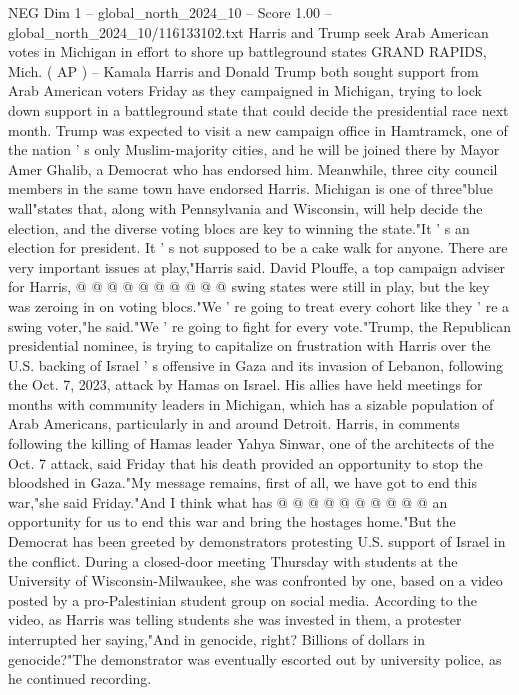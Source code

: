 \begin{textsample}{NEG Dim 1 – global\_north\_2024\_10 – Score 1.00 – global\_north\_2024\_10/116133102.txt}  \label{ex:f1_neg_374}
Harris and Trump seek Arab American votes in Michigan in effort to shore up battleground states GRAND RAPIDS, Mich. ( AP ) -- Kamala Harris and Donald Trump both sought support from Arab American voters Friday as they campaigned in Michigan, trying to lock down support in a battleground state that could decide the presidential race next month.
Trump was expected to visit a new campaign office in Hamtramck, one of the nation ' s only Muslim-majority cities, and he will be joined there by Mayor Amer Ghalib, a Democrat who has endorsed him.
Meanwhile, three city council members in the same town have endorsed Harris.
Michigan is one of three"blue wall"states that, along with Pennsylvania and Wisconsin, will help decide the election, and the diverse voting blocs are key to winning the state."It ' s an election for president.
It ' s not supposed to be a cake walk for anyone.
There are very important issues at play,"Harris said.
David Plouffe, a top campaign adviser for Harris, @ @ @ @ @ @ @ @ @ @ swing states were still in play, but the key was zeroing in on voting blocs."We ' re going to treat every cohort like they ' re a swing voter,"he said."We ' re going to fight for every vote."Trump, the Republican presidential nominee, is trying to capitalize on frustration with Harris over the U.S. backing of Israel ' s offensive in Gaza and its invasion of Lebanon, following the Oct. 7, 2023, attack by Hamas on Israel.
His allies have held meetings for months with community leaders in Michigan, which has a sizable population of Arab Americans, particularly in and around Detroit.
Harris, in comments following the killing of Hamas leader Yahya Sinwar, one of the architects of the Oct. 7 attack, said Friday that his death provided an opportunity to stop the bloodshed in Gaza."My message remains, first of all, we have got to end this war,"she said Friday."And I think what has @ @ @ @ @ @ @ @ @ @ an opportunity for us to end this war and bring the hostages home."But the Democrat has been greeted by demonstrators protesting U.S. support of Israel in the conflict.
During a closed-door meeting Thursday with students at the University of Wisconsin-Milwaukee, she was confronted by one, based on a video posted by a pro-Palestinian student group on social media.
According to the video, as Harris was telling students she was invested in them, a protester interrupted her saying,"And in genocide, right?
Billions of dollars in genocide?"The demonstrator was eventually escorted out by university police, as he continued recording.

\end{textsample}
